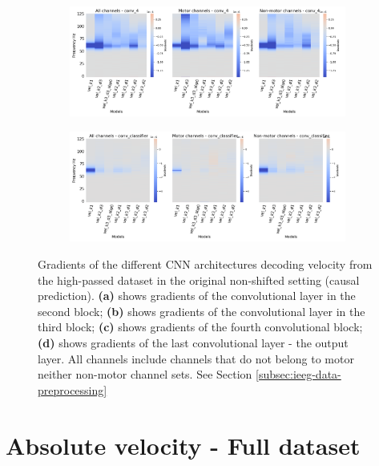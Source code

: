 \begin{figure}[!htbp]\ContinuedFloat

\begin{subfigure}[c]{\textwidth}
   \includegraphics[width=0.9\linewidth]{img/appendix/A/conv-4/hp-m/vel-model_gradients_all_kinds}
   \caption{}
   \label{fig:vel-hp-grads-conv-4}
\end{subfigure}

\begin{subfigure}[d]{\textwidth}
   \includegraphics[width=0.9\linewidth]{img/appendix/A/conv-classifier/hp-m/vel-model_gradients_all_kinds}
   \caption{}
   \label{fig:vel-hp-grads-conv-classifier}
\end{subfigure}

\caption[]{Gradients of the different CNN architectures decoding velocity from the high-passed dataset in the original non-shifted setting (causal prediction). \textbf{(a)} shows gradients of the convolutional layer in the second block; \textbf{(b)} shows gradients of the convolutional layer in the third block; \textbf{(c)} shows gradients of the fourth convolutional block; \textbf{(d)} shows gradients of the last convolutional layer - the output layer. All channels include channels that do not belong to motor neither non-motor channel sets. See Section \ref{subsec:ieeg-data-preprocessing}}
\label{fig:vel-hp-grads}
\end{figure}
\clearpage

\section*{Absolute velocity - Full dataset}\label{sec:absolute-velocity-appendixA}

